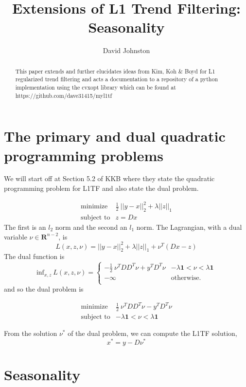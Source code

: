\documentclass{article}
\begin{document}
\title{Extensions of L1 Trend Filtering: Seasonality}
\author{David Johnston}

\maketitle

\begin{abstract}
This paper extends and further elucidates ideas from Kim, Koh \& Boyd for L1 regularized
trend filtering and acts a documentation to a repository of a python
implementation using the cvxopt library which can be found at https://github.com/dave31415/myl1tf
\end{abstract}

\section{The primary and dual quadratic programming problems}

We will start off at Section 5.2 of KKB where they state the quadratic programming problem for L1TF
and also state the dual problem.

\begin{eqnarray}
\mbox{minimize} & \frac{1}{2} ~ || y - x ||_2^2  + \lambda ||z||_1 \\
\mbox{subject to} & z = D x
\end{eqnarray}
The first is an $l_2$ norm and the second an $l_1$ norm. The Lagrangian, with a dual variable $\nu \in \mathbf{R}^{n-2}$, is
\[
L(x,z,\nu) =  || y - x ||_2^2  + \lambda ||z||_1 + \nu^T (D x -z)
\]
The dual function is
\[
\mbox{inf}_{x,z} ~ L(x,z,\nu) =
    \left\{
    \begin{array}{ll}
    - \frac{1}{2} ~ \nu^T D D^T \nu + y^T D^T \nu &  - \lambda \mathbf{1} < \nu < \lambda \mathbf{1} \\
  -\infty  & \mbox{otherwise.} \\
  \end{array}
  \right.
\]
and so the dual problem is

\begin{eqnarray}
\mbox{minimize} & \frac{1}{2} ~ \nu^T D D^T \nu - y^T D^T \nu \\
\mbox{subject to} & - \lambda \mathbf{1} < \nu < \lambda \mathbf{1}
\end{eqnarray}

From the solution $\nu^*$ of the dual problem, we can compute the L1TF solution,
\[
x^* = y - D \nu^*
\]

\section{Seasonality}
\end{document}
